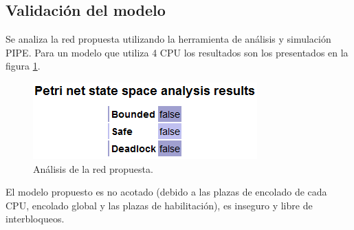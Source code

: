 \documentclass[a4paper]{book}
\begin{document}
\subsection{Validaci\'on del modelo}
Se analiza la red propuesta utilizando la herramienta de an\'alisis y simulaci\'on PIPE. Para un modelo que utiliza 4 CPU los resultados son los presentados en la figura \ref{Fig:validacion11}.

\begin{figure} [H]
	\begin{center}
        \includegraphics[scale=0.7]{./imagenes/it11validacion.png}
		\caption{An\'alisis de la red propuesta.}
		\label{Fig:validacion11}
	\end{center}
\end{figure}

El modelo propuesto es no acotado (debido a las plazas de encolado de cada CPU, encolado global y las plazas de habilitaci\'on), es inseguro y libre de interbloqueos.
\end{document}

